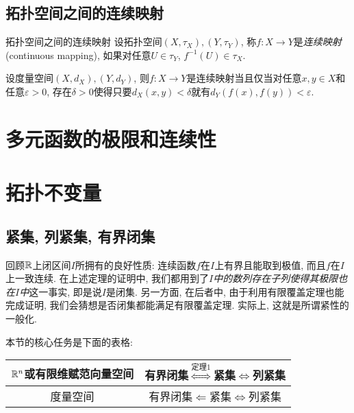 \subsection{拓扑空间之间的连续映射}

\begin{definition}{拓扑空间之间的连续映射}
	设拓扑空间$(X,\tau _X),(Y,\tau _Y)$, 称$f: X \to Y$是\textit{连续映射}(continuous mapping), 如果对任意$U \in \tau _Y$, $f^{-1}(U) \in \tau _X$. 
\end{definition}

\begin{proposition}{}
	设度量空间$(X,d_X),(Y,d_Y)$, 则$f:X \to Y$是连续映射当且仅当对任意$x,y \in X$和任意$\varepsilon >0$, 存在$\delta >0$使得只要$d_X(x,y)<\delta$就有$d_Y(f(x),f(y))<\varepsilon$. 
\end{proposition}

\newpage
\section{多元函数的极限和连续性}

\newpage
\section{拓扑不变量}

\subsection{紧集, 列紧集, 有界闭集}

回顾$\mathbb{R}$上闭区间$I$所拥有的良好性质: 连续函数$f$在$I$上有界且能取到极值, 而且$f$在$I$上一致连续. 在上述定理的证明中, 我们都用到了\textit{$I$中的数列存在子列使得其极限也在$I$中}这一事实, 即是说$I$是闭集. 另一方面, 在后者中, 由于利用有限覆盖定理也能完成证明, 我们会猜想是否闭集都能满足有限覆盖定理. 实际上, 这就是所谓紧性的一般化. 

本节的核心任务是下面的表格: 

\begin{table}[h]
	\centering
	\renewcommand\arraystretch{1.5}
	\begin{tabular}{|c|c|}
\hline
$\mathbb{R}^n$或有限维赋范向量空间 & 有界闭集$\stackrel{\textit{定理}1}{\Longleftrightarrow}$紧集$\Longleftrightarrow$列紧集 \\ \hline
度量空间             & 有界闭集$\Longleftarrow$紧集$\Longleftrightarrow$列紧集      \\ \hline
\end{tabular}
\end{table}

